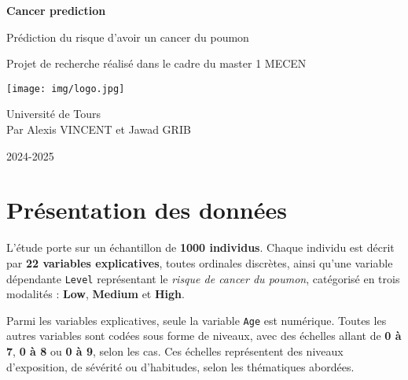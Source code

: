 \documentclass[a4paper,11pt]{article}
\begin{document}








\begin{titlepage}
    \begin{center}
    
        \vspace{2cm}
        \Huge
        \textbf{Cancer prediction}
            
        \vspace{1cm}
        \LARGE
        Prédiction du risque d'avoir un cancer du poumon
            
        \vspace{3cm}
            
        Projet de recherche réalisé dans le cadre du master 1 MECEN
            
        \vspace{7cm}
            
        \texttt{[image: img/logo.jpg]}

        \vspace{2cm}

        \Large
        Université de Tours \\

        Par Alexis VINCENT et Jawad GRIB

        2024-2025
            
    \end{center}
    
\end{titlepage}

\begin{center}
    \tableofcontents
\end{center}

\newpage

\section{Présentation des données}

L'étude porte sur un échantillon de \textbf{1000 individus}. Chaque individu est décrit par \textbf{22 variables explicatives}, toutes ordinales discrètes, ainsi qu'une variable dépendante \texttt{Level} représentant le \textit{risque de cancer du poumon}, catégorisé en trois modalités : \textbf{Low}, \textbf{Medium} et \textbf{High}.

Parmi les variables explicatives, seule la variable \texttt{Age} est numérique. Toutes les autres variables sont codées sous forme de niveaux, avec des échelles allant de \textbf{0 à 7}, \textbf{0 à 8} ou \textbf{0 à 9}, selon les cas. Ces échelles représentent des niveaux d'exposition, de sévérité ou d'habitudes, selon les thématiques abordées.
\end{document}
